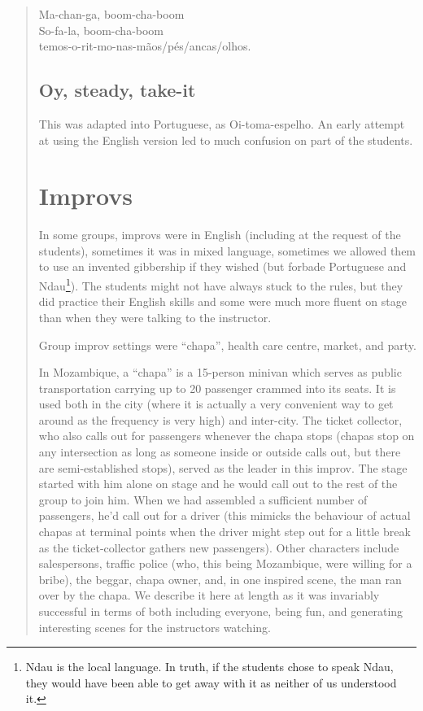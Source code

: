 \documentclass[article,twoside]{memoir}
\begin{document}
\begin{verse}
Ma-chan-ga, boom-cha-boom\\
So-fa-la, boom-cha-boom\\
temos-o-rit-mo-nas-mãos/pés/ancas/olhos.

\subsection{Oy, steady, take-it}
This was adapted into Portuguese, as Oi-toma-espelho. An early attempt at using
the English version led to much confusion on part of the students.

\section{Improvs}

In some groups, improvs were in English (including at the request of the
students), sometimes it was in mixed language, sometimes we allowed them to use
an invented gibbership if they wished (but forbade Portuguese and
Ndau\footnote{Ndau is the local language. In truth, if the students chose to
speak Ndau, they would have been able to get away with it as neither of us
understood it.}). The students might not have always stuck to the rules, but
they did practice their English skills and some were much more fluent on stage
than when they were talking to the instructor.

Group improv settings were ``chapa'', health care centre, market, and party.

In Mozambique, a ``chapa'' is a 15-person minivan which serves as public
transportation carrying up to 20 passenger crammed into its seats. It is used
both in the city (where it is actually a very convenient way to get around as
the frequency is very high) and inter-city. The ticket collector, who also
calls out for passengers whenever the chapa stops (chapas stop on any
intersection as long as someone inside or outside calls out, but there are
semi-established stops), served as the leader in this improv. The stage started
with him alone on stage and he would call out to the rest of the group to join
him. When we had assembled a sufficient number of passengers, he'd call out for
a driver (this mimicks the behaviour of actual chapas at terminal points when
the driver might step out for a little break as the ticket-collector gathers
new passengers). Other characters include salespersons, traffic police (who,
this being Mozambique, were willing for a bribe), the beggar, chapa owner, and,
in one inspired scene, the man ran over by the chapa. We describe it here at
length as it was invariably successful in terms of both including everyone,
being fun, and generating interesting scenes for the instructors watching.


\end{verse}
\end{document}
